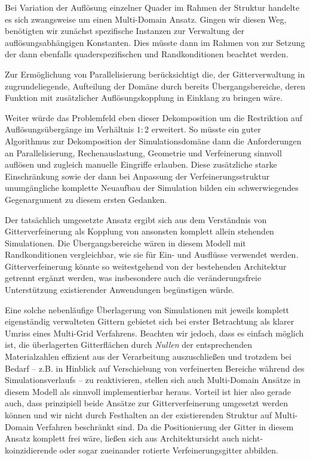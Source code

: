 Bei Variation der Auflösung einzelner Quader im Rahmen der  Struktur handelte es sich zwangsweise um einen Multi-Domain Ansatz. Gingen wir diesen Weg, benötigten wir zunächst  spezifische  Instanzen zur Verwaltung der auflösungsabhängigen Konstanten. Dies müsste dann im Rahmen von  zur Setzung der dann ebenfalls quaderspezifischen  und Randkonditionen beachtet werden.

Zur Ermöglichung von Parallelisierung berücksichtigt die, der Gitterverwaltung in  zugrundeliegende, Aufteilung der Domäne durch  bereits Übergangsbereiche, deren Funktion mit zusätzlicher Auflösungskopplung in Einklang zu bringen wäre.

Weiter würde das Problemfeld eben dieser Dekomposition um die Restriktion auf Auflösungsübergänge im Verhältnis \(1:2\) erweitert. So müsste ein guter Algorithmus zur Dekomposition der Simulationsdomäne dann die Anforderungen an Parallelisierung, Rechenauslastung, Geometrie und Verfeinerung sinnvoll auflösen und zugleich manuelle Eingriffe erlauben. Diese zusätzliche starke Einschränkung sowie der dann bei Anpassung der Verfeinerungsstruktur unumgängliche komplette Neuaufbau der Simulation bilden ein schwerwiegendes Gegenargument zu diesem ersten Gedanken.

\bigskip
Der tatsächlich umgesetzte Ansatz ergibt sich aus dem Verständnis von Gitterverfeinerung als Kopplung von ansonsten komplett allein stehenden Simulationen. Die Übergangsbereiche wären in diesem Modell mit Randkonditionen vergleichbar, wie sie für Ein- und Ausflüsse verwendet werden. Gitterverfeinerung könnte so weitestgehend von der bestehenden Architektur getrennt ergänzt werden, was insbesondere auch die veränderungsfreie Unterstützung existierender Anwendungen begünstigen würde.

Eine solche nebenläufige Überlagerung von Simulationen mit jeweils komplett eigenständig verwalteten Gittern gebietet sich bei erster Betrachtung als klarer Umriss eines Multi-Grid Verfahrens. Beachten wir jedoch, dass es einfach möglich ist, die überlagerten Gitterflächen durch \emph{Nullen} der entsprechenden Materialzahlen effizient aus der Verarbeitung auszuschließen und trotzdem bei Bedarf -- z.B. in Hinblick auf Verschiebung von verfeinerten Bereiche während des Simulationsverlaufs -- zu reaktivieren, stellen sich auch Multi-Domain Ansätze in diesem Modell als sinnvoll implementierbar heraus. Vorteil ist hier also gerade auch, dass prinzipiell beide Ansätze zur Gitterverfeinerung umgesetzt werden können und wir nicht durch Festhalten an der existierenden Struktur auf Multi-Domain Verfahren beschränkt sind. Da die Positionierung der Gitter in diesem Ansatz komplett frei wäre, ließen sich aus Architektursicht auch nicht-koinzidierende oder sogar zueinander rotierte Verfeinerungsgitter abbilden.

